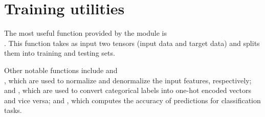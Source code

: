 \section{Training utilities}

The most useful function provided by the  module is\\. This function takes as input two tensors (input data and target data) and splits them into training and testing sets.

Other notable functions include  and\\, which are used to normalize and denormalize the input features, respectively;  and , which are used to convert categorical labels into one-hot encoded vectors and vice versa; and , which computes the accuracy of predictions for classification tasks.
